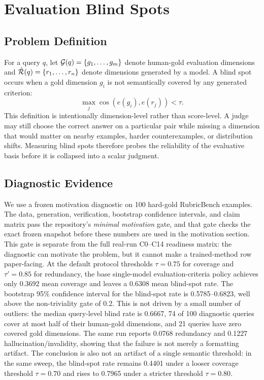 \section{Evaluation Blind Spots}

\subsection{Problem Definition}

For a query $q$, let $\mathcal{G}(q)=\{g_1,\ldots,g_m\}$ denote human-gold
evaluation dimensions and $\hat{\mathcal{R}}(q)=\{r_1,\ldots,r_n\}$ denote dimensions
generated by a model. A blind spot occurs when a gold dimension $g_i$ is not
semantically covered by any generated criterion:
\[
  \max_j \cos(e(g_i), e(r_j)) < \tau.
\]
This definition is intentionally dimension-level rather than score-level. A
judge may still choose the correct answer on a particular pair while missing a
dimension that would matter on nearby examples, harder counterexamples, or
distribution shifts. Measuring blind spots therefore probes the reliability of
the evaluative basis before it is collapsed into a scalar judgment.

\subsection{Diagnostic Evidence}

We use a frozen motivation diagnostic on 100 hard-gold RubricBench examples.
The data, generation, verification, bootstrap confidence intervals, and claim
matrix pass the repository's \emph{minimal motivation} gate, and that gate
checks the exact frozen snapshot before these numbers are used in the
motivation section. This gate is separate from the full real-run C0--C14
readiness matrix: the diagnostic can motivate the problem, but it cannot make a
trained-method row paper-facing. At the
default protocol thresholds $\tau=0.75$ for coverage and $\tau'=0.85$ for
redundancy, the base single-model evaluation-criteria policy achieves only 0.3692 mean
coverage and leaves a 0.6308 mean blind-spot rate. The bootstrap 95\%
confidence interval for the blind-spot rate is 0.5785--0.6823, well above the
non-triviality gate of 0.2.
This is not driven by a small number of outliers: the median query-level blind
rate is 0.6667, 74 of 100 diagnostic queries cover at most half of their
human-gold dimensions, and 21 queries have zero covered gold dimensions. The
same run reports 0.0768 redundancy and 0.1227 hallucination/invalidity,
showing that the failure is not merely a formatting artifact.
The conclusion is also not an artifact of a single semantic threshold: in the
same sweep, the blind-spot rate remains 0.4401 under a looser coverage
threshold $\tau=0.70$ and rises to 0.7965 under a stricter threshold
$\tau=0.80$.


